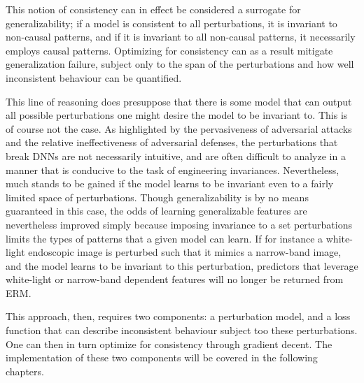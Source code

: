 This notion of consistency can in effect be considered a surrogate for generalizability; if a model is consistent to all perturbations, it is invariant to non-causal patterns, and if it is invariant to all non-causal patterns, it necessarily employs causal patterns. Optimizing for consistency can as a result mitigate generalization failure, subject only to the span of the perturbations and how well inconsistent behaviour can be quantified.

This line of reasoning does presuppose that there is some model that can output all possible perturbations one might desire the model to be invariant to. This is of course not the case. As highlighted by the pervasiveness of adversarial attacks and the relative ineffectiveness of adversarial defenses, the perturbations that break DNNs are not necessarily intuitive, and are often difficult to analyze in a manner that is conducive to the task of engineering invariances. Nevertheless, much stands to be gained if the model learns to be invariant even to a fairly limited space of perturbations. Though generalizability is by no means guaranteed in this case, the odds of learning generalizable features are nevertheless improved simply because imposing invariance to a set perturbations limits the types of patterns that a given model can learn. If for instance a white-light endoscopic image is perturbed such that it mimics a narrow-band image, and the model learns to be invariant to this perturbation, predictors that leverage white-light or narrow-band dependent features will no longer be returned from ERM.

This approach, then, requires two components: a perturbation model, and a loss function that can describe inconsistent behaviour subject too these perturbations. One can then in turn optimize for consistency through gradient decent. The implementation of these two components will be covered in the following chapters.
    
